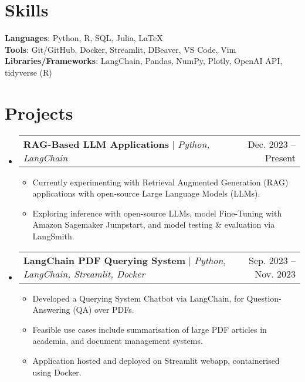 \documentclass[letterpaper,11pt]{article}
\makeatletter
\newcommand{\resumeItem}[1]{
  \item\small{
    {#1 \vspace{-2pt}}
  }
}
\newcommand{\resumeProjectHeading}[2]{
    \item
    \begin{tabular*}{1.001\textwidth}{l@{\extracolsep{\fill}}r}
      \small#1 & \small #2\\
    \end{tabular*}\vspace{-7pt}
}
\newcommand{\resumeSubHeadingListStart}{\begin{itemize}[leftmargin=0.0in, label={}]}
\newcommand{\resumeSubHeadingListEnd}{\end{itemize}}
\newcommand{\resumeItemListStart}{\begin{itemize}}
\newcommand{\resumeItemListEnd}{\end{itemize}\vspace{-5pt}}
\makeatother
\begin{document}
%
\section{Skills}
  \begin{itemize}[leftmargin=0.15in, label={}]
      \small{\item{
      \textbf{Languages}{: Python, R, SQL, Julia, \LaTeX} \\
      \textbf{Tools}{: Git/GitHub, Docker, Streamlit, DBeaver, VS Code, Vim} \\
      \textbf{Libraries/Frameworks}{: LangChain, Pandas, NumPy, Plotly, OpenAI API, tidyverse (R)}  \\
      }}
  \end{itemize} 

\section{Projects}
    
    \resumeSubHeadingListStart
      \resumeProjectHeading
          {\textbf{RAG-Based LLM Applications} $|$ \emph{Python, LangChain}}{Dec. 2023 -- Present}
          \resumeItemListStart
            \resumeItem{Currently experimenting with Retrieval Augmented Generation (RAG) applications with open-source Large Language Models (LLMs).}
            \resumeItem{Exploring inference with open-source LLMs, model Fine-Tuning with Amazon Sagemaker Jumpstart, and model testing \& evaluation via LangSmith.}
          \resumeItemListEnd
          \vspace{-13pt}
    \resumeSubHeadingListEnd

    \resumeSubHeadingListStart
      \resumeProjectHeading
          {\textbf{LangChain PDF Querying System} $|$ \emph{Python, LangChain, Streamlit, Docker}}{Sep. 2023 -- Nov. 2023}
          \resumeItemListStart
            \resumeItem{Developed a Querying System Chatbot via LangChain, for Question-Answering (QA) over PDFs.}
            \resumeItem{Feasible use cases include summarisation of large PDF articles in academia, and document management systems.}
            \resumeItem{Application hosted and deployed on Streamlit webapp, containerised using Docker.}
          \resumeItemListEnd
    \resumeSubHeadingListEnd
\end{document}
